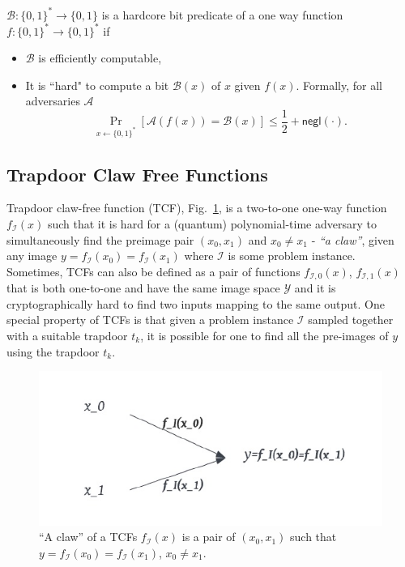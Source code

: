 \documentclass[cryptography,review,submit,pdftex,moreauthors,amsmath,amssymb,aps,strict]{Definitions/mdpi}
\begin{document}
\begin{Definition}
    $\mathcal{B}:\{0,1\}^*\to\{0,1\}$ is a hardcore bit predicate of a one way function $f:\{0,1\}^*\to\{0,1\}^*$ if
    \begin{itemize}
        \item $\mathcal{B}$ is efficiently computable,
        \item It is “hard" to compute a bit $\mathcal{B}(x)$ of $x$ given $f(x)$. Formally, for all adversaries $\mathcal{A}$
        $$\Pr_{x\gets\{0,1\}^*}[\mathcal{A}(f(x))=\mathcal{B}(x)]\leq \displaystyle\frac{1}{2}+\mathsf{negl}(\cdot).$$
    \end{itemize}
\end{Definition}


\subsection{Trapdoor Claw Free Functions}\label{TCFs}


Trapdoor claw-free function (TCF), Fig.~\ref{fig:TCF}, is a two-to-one one-way function $f_\mathcal{I}(x)$ such that it is hard for a (quantum) polynomial-time adversary to simultaneously find the preimage pair $(x_0,x_1)$ and $x_0\neq x_1$ - \textit{``a claw''}, given any image $y = f_{\mathcal{I}}(x_0)=f_{\mathcal{I}}(x_1)$  where $\mathcal{I}$ is some problem instance. Sometimes, TCFs can also be defined as a pair of functions $f_{\mathcal{I},0}(x)$, $f_{\mathcal{I},1}(x)$ that is both one-to-one and have the same image space $\mathcal{Y}$ and it is cryptographically hard to find two inputs mapping to the same output. One special property of TCFs is that given a problem instance $\mathcal{I}$ sampled together with a suitable trapdoor $t_{k}$, it is possible for one to find all the pre-images of $y$ using the trapdoor $t_{k}$. 

\begin{figure}[!htb]
	\centering
	\includegraphics[]{figures/TCF.pdf}
	\caption{``A claw'' of a TCFs $f_{\mathcal{I}}(x)$ is a pair of $(x_0,x_1)$ such that $y=f_{\mathcal{I}}(x_0)=f_{\mathcal{I}}(x_1)$, $x_0\neq x_1$.}\label{fig:TCF}
\end{figure}
\end{document}
